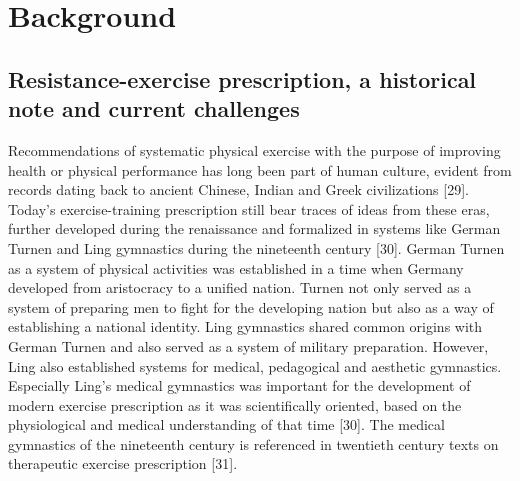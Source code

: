 \documentclass[twoside,10pt]{gihclass} %
\begin{document}
\hypertarget{background}{%
\chapter{Background}\label{background}}

\hypertarget{resistance-exercise-prescription-a-historical-note-and-current-challenges}{%
\section{Resistance-exercise prescription, a historical note and current challenges}\label{resistance-exercise-prescription-a-historical-note-and-current-challenges}}

Recommendations of systematic physical exercise with the purpose of improving health or physical performance has long been part of human culture, evident from records dating back to ancient Chinese, Indian and Greek civilizations
{[}29{]}.
Today's exercise-training prescription still bear traces of ideas from these eras, further developed during the renaissance and formalized in systems like German Turnen and Ling gymnastics during the nineteenth century
{[}30{]}.
German Turnen as a system of physical activities was established in a time when Germany developed from aristocracy to a unified nation.
Turnen not only served as a system of preparing men to fight for the developing nation but also as a way of establishing a national identity.
Ling gymnastics shared common origins with German Turnen and also served as a system of military preparation.
However, Ling also established systems for medical, pedagogical and aesthetic gymnastics.
Especially Ling's medical gymnastics was important for the development of modern exercise prescription as it was scientifically oriented, based on the physiological and medical understanding of that time {[}30{]}.
The medical gymnastics of the nineteenth century is referenced in twentieth century texts on therapeutic exercise prescription
{[}31{]}.
\end{document}
